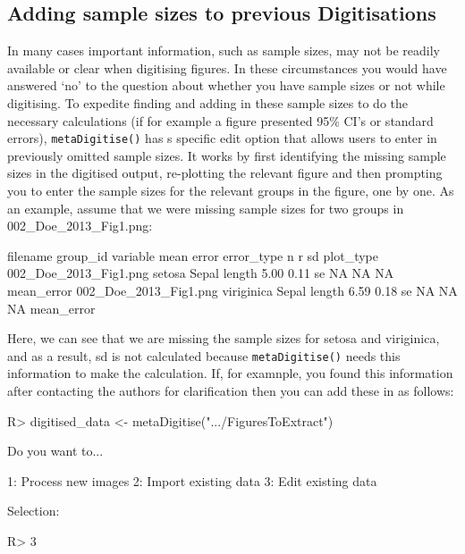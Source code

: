 \documentclass[12pt]{article}
\newcommand{\fct}[1]{\texttt{#1()}}
\begin{document}
\subsection{Adding sample sizes to previous Digitisations}
In many cases important information, such as sample sizes, may not be readily available or clear when digitising figures. In these circumstances you would have answered `no' to the question about whether you have sample sizes or not while digitising. To expedite finding and adding in these sample sizes to do the necessary calculations (if for example a figure presented 95\% CI's or standard errors), \fct{metaDigitise} has s specific edit option that allows users to enter in previously omitted sample sizes. It works by first identifying the missing sample sizes in the digitised output, re-plotting the relevant figure and then prompting you to enter the sample sizes for the relevant groups in the figure, one by one. As an example, assume that we were missing sample sizes for two groups in 002\_Doe\_2013\_Fig1.png:

\begin{CodeChunk}
{\scriptsize
\begin{CodeOutput}
            filename    group_id         variable   mean  error error_type n    r    sd   plot_type
002_Doe_2013_Fig1.png      setosa  Sepal length      5.00  0.11  se        NA  NA    NA  mean_error
002_Doe_2013_Fig1.png  viriginica  Sepal length      6.59  0.18  se        NA  NA    NA  mean_error
\end{CodeOutput}
}
\end{CodeChunk}

Here, we can see that we are missing the sample sizes for setosa and viriginica, and as a result, sd is not calculated because \fct{metaDigitise} needs this information to make the calculation. If, for examnple, you found this information after contacting the authors for clarification then you can add these in as follows:

\begin{CodeChunk}
\begin{CodeInput}
R> digitised_data <- metaDigitise(".../FiguresToExtract")
\end{CodeInput}
\end{CodeChunk}

\begin{CodeChunk}
\begin{CodeOutput}
Do you want to...

1: Process new images
2: Import existing data
3: Edit existing data

Selection:
\end{CodeOutput}
\begin{CodeInput}
R> 3
\end{CodeInput}
\end{CodeChunk}
\end{document}
